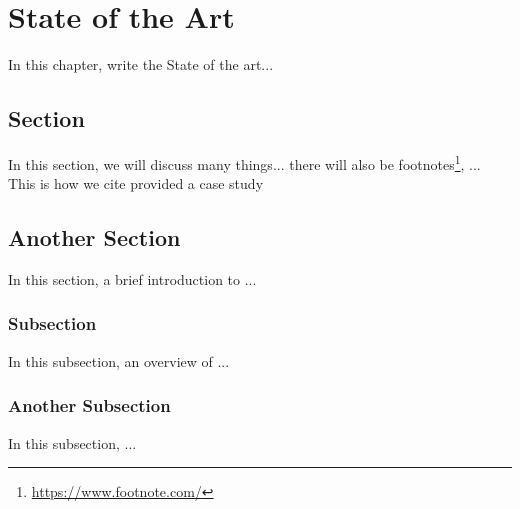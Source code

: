\chapter{State of the Art}
\label{cha:soa}
\vspace{0.4 cm}

In this chapter, write the State of the art...


\section{Section}
\label{sec:data}
\vspace{0.2 cm}

In this section, we will discuss many things... there will also be footnotes\footnote{ \url{https://www.footnote.com/} }, ...
This is how we cite\cite{Nguyen2019} provided a case study

\section{Another Section}
\label{sec:timeseries}
\vspace{0.2 cm}

In this section, a brief introduction to ... 

\vspace{0.1 cm}
\subsection{Subsection}
\label{sec:transformers}
\vspace{0.1 cm}

In this subsection, an overview of ...

\vspace{0.1 cm}
\subsection{Another Subsection}
\label{sec:automl}
\vspace{0.1 cm}

In this subsection, ...